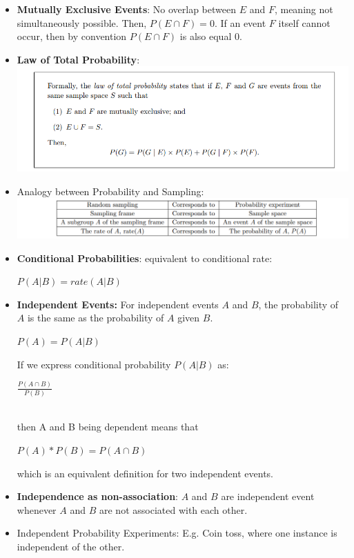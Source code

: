 \documentclass[10pt, landscape]{article}
\begin{document}
\begin{multicols*}{3}
\begin{itemize}
	\item \textbf{Mutually Exclusive Events}: No overlap between $E$ and $F$, meaning not simultaneously possible. Then, $P(E \cap F) = 0 $. If an event $F$ itself cannot occur, then by convention $P(E \cap F) $ is also equal $0$.
	\item \textbf{Law of Total Probability}:
	\includegraphics[width = \linewidth]{lawoftotalprobability}
	\item Analogy between Probability and Sampling:
	\includegraphics[width = \linewidth]{tableanalogy}
	\item \textbf{Conditional Probabilities}: equivalent to conditional rate:
	\centerline {$P ( A \vert B ) = rate ( A \vert B ) $}
	\item \textbf{Independent Events:} For independent events $A$ and $B$, the probability of $A$ is the same as the probability of $A$ given $B$.
	\centerline {$P(A) = P(A \vert B)$}
	If we express conditional probability $P(A \vert B)$ as: \\
	\centerline	{$\frac{P(A \cap B)}{P(B)} $} ~\\
	then A and B being dependent means that 
	\centerline {$ P(A) * P(B) = P(A \cap B) $}
	which is an equivalent definition for two independent events.
	\item \textbf{Independence as non-association}: $A$ and $B$ are independent event whenever $A$ and $B$ are not associated with each other.
	\item Independent Probability Experiments: E.g. Coin toss, where one instance is independent of the other.
\end{itemize}


\end{multicols*}
\end{document}
